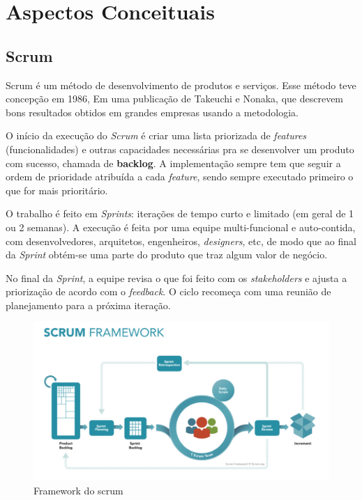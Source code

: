 \chapter{Aspectos Conceituais}
    \section{Scrum} %
    Scrum\cite{essentialscrum} é um método de desenvolvimento de produtos e serviços. Esse método teve concepção em 1986, Em uma publicação\cite{scrumorigin} de Takeuchi e Nonaka, que descrevem bons resultados obtidos em grandes empresas usando a metodologia.
    
    O início da execução do \textit{Scrum} é criar uma lista priorizada de \textit{features} (funcionalidades) e outras capacidades necessárias pra se desenvolver um produto com sucesso, chamada de \textbf{backlog}. A implementação sempre tem que seguir a ordem de prioridade atribuída a cada \textit{feature}, sendo sempre executado primeiro o que for mais prioritário.
    
    O trabalho é feito em \textit{Sprints}: iterações de tempo curto e limitado (em geral de 1 ou 2 semanas). A execução é feita por uma equipe multi-funcional e auto-contida, com desenvolvedores, arquitetos, engenheiros, \textit{designers}, etc, de modo que ao final da \textit{Sprint} obtém-se uma parte do produto que traz algum valor de negócio.
    
    No final da \textit{Sprint}, a equipe revisa o que foi feito com os \textit{stakeholders} e ajusta a priorização de acordo com o \textit{feedback}. O ciclo recomeça com uma reunião de planejamento para a próxima iteração.
    
    \begin{figure}[htb]
		\caption{\label{fig:scrum} Framework do scrum}
		\begin{center}
		\includegraphics[width=\textwidth,keepaspectratio]{pictures/ScrumFrameworkTest.png}
		\end{center}
	\end{figure}

